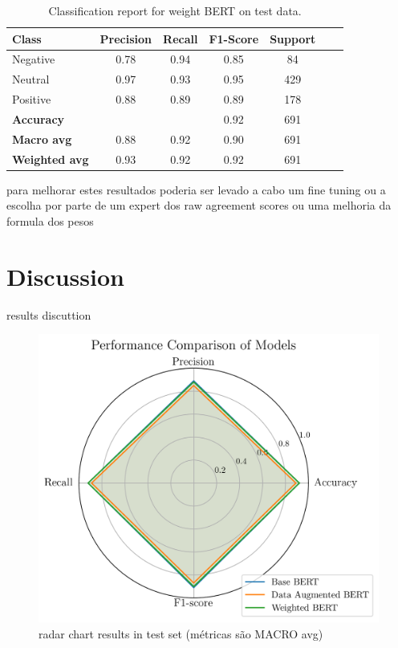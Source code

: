 \documentclass[conference]{IEEEtran}
\begin{document}
\begin{table}[H]
\centering
\caption{Classification report for weight BERT on test data.}
\label{cr_augmbert_test}
\begin{tabular}{lcccccc}
\toprule
\textbf{Class} & \textbf{Precision} & \textbf{Recall} & \textbf{F1-Score} & \textbf{Support} \\
\midrule
Negative & 0.78 & 0.94 & 0.85 & 84 \\
Neutral & 0.97 & 0.93 & 0.95 & 429 \\
Positive & 0.88 & 0.89 & 0.89 & 178 \\
\midrule
\textbf{Accuracy} &  &  & 0.92 & 691 \\
\textbf{Macro avg} & 0.88 & 0.92 & 0.90 & 691 \\
\textbf{Weighted avg} & 0.93 & 0.92 & 0.92 & 691 \\
\bottomrule
\end{tabular}
\end{table}

para melhorar estes resultados poderia ser levado a cabo um fine tuning ou a escolha por parte de um expert dos raw agreement scores ou uma melhoria da formula dos pesos


\section{Discussion}

results discuttion

\begin{figure}[H]
    \centering
    \includegraphics[width=1\linewidth]{assets/results_radarchart.png}
    \caption{radar chart results in test set (métricas são MACRO avg)}
    \label{fig:results_radarchart}
\end{figure}
\end{document}
